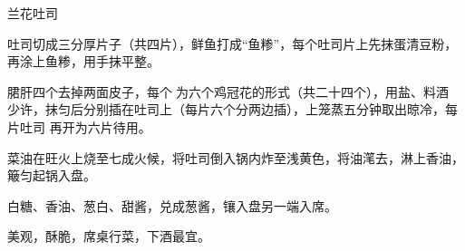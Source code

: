 %
%
%
%
%
%
%
\begin{recipe}{兰花吐司}

\ingredients


\preparation

\step 吐司切成三分厚片子（共四片），鲜鱼打成“鱼糁”，每个吐司片上先抹蛋清豆粉，
再涂上鱼糁，用手抹平整。

\step 𬂁肝四个去掉两面皮子，每个𠟤为六个鸡冠花的形式（共二十四个），用盐、料酒
少许，抹匀后分别插在吐司上（每片六个分两边插），上笼蒸五分钟取出晾冷，每片吐司
再开为六片待用。

\step 菜油在旺火上烧至七成火候，将吐司倒入锅内炸至浅黄色，将油滗去，淋上香油，
簸匀起锅入盘。

\step 白糖、香油、葱白、甜酱，兑成葱酱，镶入盘另一端入席。

\features

美观，酥脆，席桌行菜，下酒最宜。

\end{recipe}

